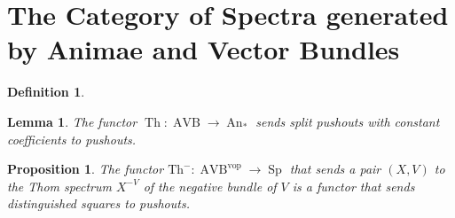 \documentclass{article}
\newcommand{\vop}{\mathrm{vop}}
\DeclareMathOperator{\AVB}{AVB}
\DeclareMathOperator{\An}{An}
\DeclareMathOperator{\Sp}{Sp}
\DeclareMathOperator{\Th}{Th}
\newtheorem{proposition}{Proposition}
\newtheorem{lemma}{Lemma}
\newtheorem{definition}{Definition}
\begin{document}
\section{The Category of Spectra generated by Animae and Vector Bundles}\label{section:spectraGenerated}


\begin{definition}

\end{definition}

\begin{lemma}
    The functor $\Th \colon \AVB \to \An_*$ sends split pushouts with constant coefficients to pushouts.    
\end{lemma}

\begin{proposition}
    The functor $\mathrm{Th}^- \colon \AVB^\vop \to \Sp$ that sends a pair $(X,V)$ to the 
    Thom spectrum $X^{-V}$ of the negative bundle of $V$ is a functor that sends distinguished squares to pushouts.
\end{proposition}
\end{document}
